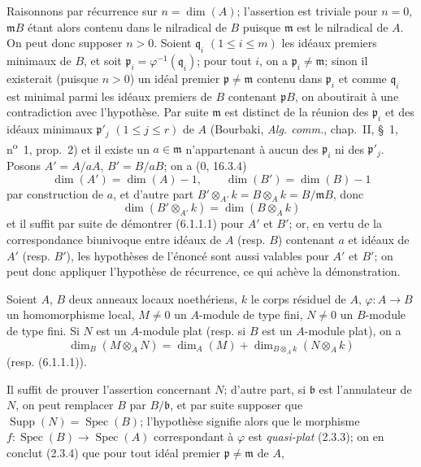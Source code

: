 Raisonnons par récurrence sur $n=\dim(A)$; l'assertion est triviale pour
$n=0$, $\mathfrak mB$ étant alors contenu dans le nilradical de $B$ puisque
$\mathfrak m$ est le nilradical de $A$. On peut donc supposer $n>0$. Soient
$\mathfrak q_i$ $(1\leq i\leq m)$ les idéaux premiers minimaux de $B$, et soit
$\mathfrak p_i=\varphi^{-1}(\mathfrak q_i)$; pour tout $i$, on a
$\mathfrak p_i\neq\mathfrak m$; sinon il existerait (puisque $n>0$) un idéal
premier $\mathfrak p\neq\mathfrak m$ contenu dans $\mathfrak p_i$ et comme
$\mathfrak q_i$ est minimal parmi les idéaux premiers de $B$ contenant
$\mathfrak pB$, on aboutirait à une contradiction avec l'hypothèse. Par suite
$\mathfrak m$ est distinct de la réunion des $\mathfrak p_i$ et des idéaux
minimaux $\mathfrak p'_j$ $(1\leq j\leq r)$ de $A$ (Bourbaki,
\emph{Alg. comm.}, chap.~II, §~1, n\textsuperscript{o}~1, prop.~2) et il
existe un $a\in\mathfrak m$ n'appartenant à aucun des $\mathfrak p_i$ ni des
$\mathfrak p'_j$. Posons $A'=A/aA$, $B'=B/aB$; on a (0, 16.3.4)
\[
\dim(A')=\dim(A)-1,\qquad \dim(B')=\dim(B)-1
\]
par construction de $a$, et d'autre part
$B'\otimes_{A'}k=B\otimes_Ak=B/\mathfrak mB$, donc
\[
\dim(B'\otimes_{A'}k)=\dim(B\otimes_Ak)
\]
et il suffit par suite de démontrer (6.1.1.1) pour $A'$ et $B'$; or, en vertu
de la correspondance biunivoque entre idéaux de $A$ (resp. $B$) contenant $a$
et idéaux de $A'$ (resp. $B'$), les hypothèses de l'énoncé sont aussi
valables pour $A'$ et $B'$; on peut donc appliquer l'hypothèse de récurrence,
ce qui achève la démonstration.

\begin{corollary}[6.1.2]
\label{IV.2.s6.1.2-fr}
Soient $A$, $B$ deux anneaux locaux noethériens, $k$ le corps résiduel de
$A$, $\varphi:A\to B$ un homomorphisme local, $M\neq0$ un $A$-module de type
fini, $N\neq0$ un $B$-module de type fini. Si $N$ est un $A$-module plat
(resp. si $B$ est un $A$-module plat), on a
\begin{equation}
\dim_B(M\otimes_A N)=\dim_A(M)+
\dim_{B\otimes_Ak}(N\otimes_Ak)
\tag{6.1.2.1}\label{IV.2.s6.1.2.1-fr}
\end{equation}
(resp. (6.1.1.1)).
\end{corollary}

Il suffit de prouver l'assertion concernant $N$; d'autre part, si
$\mathfrak b$ est l'annulateur de $N$, on peut remplacer $B$ par
$B/\mathfrak b$, et par suite supposer que
$\operatorname{Supp}(N)=\operatorname{Spec}(B)$; l'hypothèse signifie alors
que le morphisme $f:\operatorname{Spec}(B)\to\operatorname{Spec}(A)$
correspondant à $\varphi$ est \emph{quasi-plat} (2.3.3); on en conclut
(2.3.4) que pour tout idéal premier $\mathfrak p\neq\mathfrak m$ de $A$,

